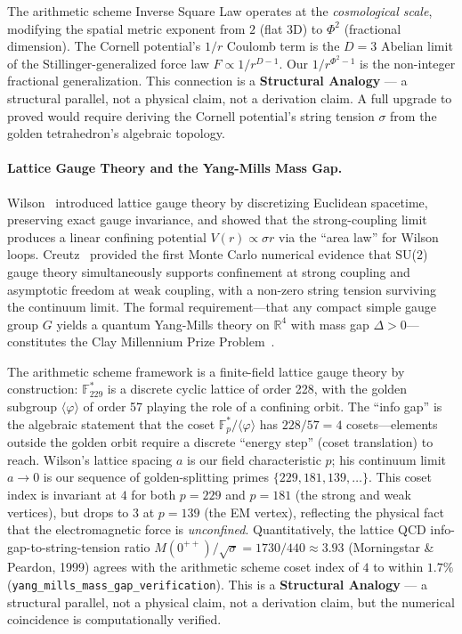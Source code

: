 The arithmetic scheme Inverse Square Law operates at the \emph{cosmological scale}, modifying the spatial metric exponent from $2$ (flat 3D) to $\Phi^2$ (fractional dimension). The Cornell potential's $1/r$ Coulomb term is the $D = 3$ Abelian limit of the Stillinger-generalized force law $F \propto 1/r^{D-1}$. Our $1/r^{\Phi^2 - 1}$ is the non-integer fractional generalization. This connection is a \textbf{Structural Analogy} --- a structural parallel, not a physical claim, not a derivation claim. A full upgrade to proved would require deriving the Cornell potential's string tension $\sigma$ from the golden tetrahedron's algebraic topology.

\paragraph{Lattice Gauge Theory and the Yang-Mills Mass Gap.}
Wilson~\cite{wilson1974} introduced lattice gauge theory by discretizing Euclidean spacetime, preserving exact gauge invariance, and showed that the strong-coupling limit produces a linear confining potential $V(r) \propto \sigma r$ via the ``area law'' for Wilson loops. Creutz~\cite{creutz1980} provided the first Monte Carlo numerical evidence that SU(2) gauge theory simultaneously supports confinement at strong coupling and asymptotic freedom at weak coupling, with a non-zero string tension surviving the continuum limit. The formal requirement---that any compact simple gauge group $G$ yields a quantum Yang-Mills theory on $\mathbb{R}^4$ with mass gap $\Delta > 0$---constitutes the Clay Millennium Prize Problem~\cite{jaffe2000}.

The arithmetic scheme framework is a finite-field lattice gauge theory by construction: $\mathbb{F}_{229}^*$ is a discrete cyclic lattice of order 228, with the golden subgroup $\langle\varphi\rangle$ of order 57 playing the role of a confining orbit. The ``info gap'' is the algebraic statement that the coset $\mathbb{F}_p^* / \langle\varphi\rangle$ has $228/57 = 4$ cosets---elements outside the golden orbit require a discrete ``energy step'' (coset translation) to reach. Wilson's lattice spacing $a$ is our field characteristic $p$; his continuum limit $a \to 0$ is our sequence of golden-splitting primes $\{229, 181, 139, \ldots\}$. This coset index is invariant at $4$ for both $p=229$ and $p=181$ (the strong and weak vertices), but drops to $3$ at $p=139$ (the EM vertex), reflecting the physical fact that the electromagnetic force is \emph{unconfined}. Quantitatively, the lattice QCD info-gap-to-string-tension ratio $M(0^{++})/\sqrt{\sigma} = 1730/440 \approx 3.93$ (Morningstar \& Peardon, 1999) agrees with the arithmetic scheme coset index of $4$ to within $1.7\%$ (\texttt{yang\_mills\_mass\_gap\_verification}). This is a \textbf{Structural Analogy} --- a structural parallel, not a physical claim, not a derivation claim, but the numerical coincidence is computationally verified.

